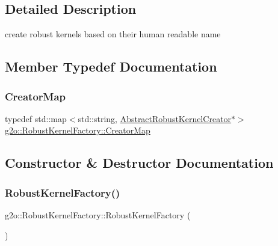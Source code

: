 \subsection{Detailed Description}
create robust kernels based on their human readable name 

\subsection{Member Typedef Documentation}
\mbox{\label{classg2o_1_1_robust_kernel_factory_aa143765542cbf4738e2137d61517b218}} 
\subsubsection{\texorpdfstring{Creator\+Map}{CreatorMap}}
{\footnotesize\ttfamily typedef std\+::map$<$std\+::string, \mbox{\hyperlink{classg2o_1_1_abstract_robust_kernel_creator}{Abstract\+Robust\+Kernel\+Creator}}$\ast$$>$ \mbox{\hyperlink{classg2o_1_1_robust_kernel_factory_aa143765542cbf4738e2137d61517b218}{g2o\+::\+Robust\+Kernel\+Factory\+::\+Creator\+Map}}\hspace{0.3cm}{\ttfamily [protected]}}



\subsection{Constructor \& Destructor Documentation}
\mbox{\label{classg2o_1_1_robust_kernel_factory_af1df5179d6823881c9c3531640029eae}} 
\subsubsection{\texorpdfstring{Robust\+Kernel\+Factory()}{RobustKernelFactory()}}
{\footnotesize\ttfamily g2o\+::\+Robust\+Kernel\+Factory\+::\+Robust\+Kernel\+Factory (\begin{DoxyParamCaption}{ }\end{DoxyParamCaption})\hspace{0.3cm}{\ttfamily [protected]}}

